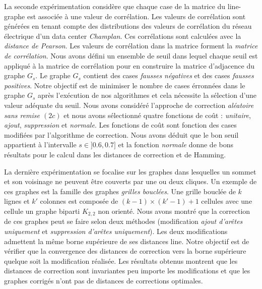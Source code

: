 La seconde exp\'erimentation consid\`ere que chaque case de la matrice du line-graphe est associ\'ee \`a une valeur de corr\'elation.  Les valeurs de corr\'elation sont g\'en\'er\'ees en tenant compte des distributions des valeurs de corr\'elation  du r\'eseau \'electrique d'un data center {\em Champlan}. Ces corr\'elations sont calcul\'ees avec la {\em distance de Pearson}. Les valeurs de corr\'elation dans la matrice forment la {\em matrice de corr\'elation}. Nous avons d\'efini un ensemble de seuil dans lequel chaque seuil est appliqu\'e \`a la matrice de corr\'elation pour en construire la matrice d'adjacence du graphe $G_s$. Le graphe $G_s$ contient des cases {\em fausses n\'egatives} et des cases {\em fausses positives}. 
Notre objectif est de minimiser le nombre de cases \'erronn\'ees dans le graphe $G_s$ apr\`es l'ex\'ecution de nos algorithmes et cela n\'ecessite la s\'election d'une valeur ad\'equate du seuil. 
Nous avons consid\'er\'e l'approche de correction  {\em al\'eatoire sans remise $(2c)$} et nous avons s\'electionn\'e quatre fonctions de co\^ut : {\em unitaire}, {\em ajout}, {\em suppression} et {\em normale}. Les fonctions de co\^ut sont fonction des cases modifi\'ees par l'algorithme de correction.
Nous avons d\'eduit que le bon seuil appartient \`a l'intervalle $s \in ]0.6,0.7]$ et la fonction {\em normale} donne de bons r\'esultats pour le calcul dans les distances de correction et de Hamming.
\newline

La derni\`ere exp\'erimentation se focalise sur les graphes dans lesquelles un sommet et son voisinage ne peuvent \^etre couverts par une ou deux cliques. Un exemple de ces graphes est la famille des graphes {\em grilles boucl\'ees}. Une grille boucl\'ee de  $k$  lignes et $k'$ colonnes est compos\'ee de $(k-1 )\times (k'-1) +1$ cellules avec une cellule un graphe biparti $K_{2,2}$ non orient\'e.
Nous avons montr\'e que la correction de ces graphes peut se faire selon deux m\'ethodes (modification  {\em ajout d'ar\^etes uniquement} et {\em suppression d'ar\^etes uniquement}). Les deux modifications admettent la m\^eme borne sup\'erieure de ses distances line. 
 Notre objectif est de v\'erifier que la convergence  des distances de correction  vers la borne sup\'erieure quelque soit la modification r\'ealis\'ee. 
 Les r\'esultats obtenus montrent que les distances de correction sont invariantes peu importe les modifications et que les  graphes corrig\'es n'ont pas de distances de corrections optimales. 
 \newline


